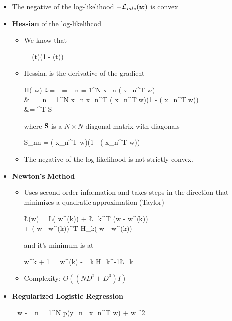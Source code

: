 \begin{itemize}
	\item The negative of the log-likelihood $- \mathcal{L}_{mle}(\bm w)$ is convex
	\item \textbf{Hessian} of the log-likelihood
	\begin{itemize}
		\item We know that
		\begin{myalign*}
		     = \sigma(t)(1 - \sigma(t))
		\end{myalign*}
		\item Hessian is the derivative of the gradient
		\begin{myalign*}
		    \*H(\* w) &= -   = \sum_{n = 1}^N  \* x_n \sigma(\* x_n^T \* w) \\
		    &= \sum_{n = 1}^N \* x_n \* x_n^T \sigma(\* x_n^T \* w)(1 - \sigma(\* x_n^T \* w)) \\
		    &= ^T \*S \tilde{\*X}
		\end{myalign*}
		where $\mathbf{S}$ is a $N \times N$ diagonal matrix with diagonals
		\begin{myalign*}
		    S_{nn} = \sigma(\* x_n^T\* w)(1 - \sigma(\* x_n^T \* w))
		\end{myalign*}
		\item The negative of the log-likelihood is not strictly convex.
	\end{itemize}
	\item \textbf{Newton's Method} %
	\begin{itemize}
		\item Uses second-order information and takes steps in the direction that minimizes a quadratic approximation (Taylor)
		\begin{myalign*}
		    \L(\*w) = \L(\* w^{(k)}) + \*\nabla\L_k^T (\*w - \* w^{(k)})\\ + (\* w - \* w^{(k)})^T \*H_k(\* w - \* w^{(k)})
		\end{myalign*}
		and it's minimum is at
		\begin{myalign*}
		    \* w^{k + 1} =\* w^{(k)} - \gamma_k \*H_k^{-1}\*\nabla\L_k
		\end{myalign*}
		\item Complexity: $O((ND^2 + D^3)I)$
	\end{itemize}
	\item \textbf{Regularized Logistic Regression}
	\begin{myalign*}
	    \argmin_{\*w} 
	    	- \sum_{n = 1}^N \ln p(\*y_n | \*x_n^T \* w) +  \lVert \*w \lVert^2
	    \end{myalign*}
\end{itemize}

